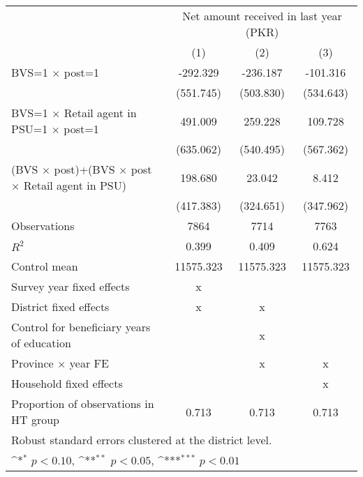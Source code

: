 {
\def\sym#1{\ifmmode^{#1}\else\(^{#1}\)\fi}
\begin{tabular}{l*{3}{c}}
\toprule
                    &\multicolumn{3}{c}{Net amount received in last year (PKR)}       \\\cmidrule(lr){2-4}
                    &\multicolumn{1}{c}{(1)}         &\multicolumn{1}{c}{(2)}         &\multicolumn{1}{c}{(3)}         \\
\midrule
BVS=1 $\times$ post=1&    -292.329         &    -236.187         &    -101.316         \\
                    &   (551.745)         &   (503.830)         &   (534.643)         \\
\addlinespace
BVS=1 $\times$ Retail agent in PSU=1 $\times$ post=1&     491.009         &     259.228         &     109.728         \\
                    &   (635.062)         &   (540.495)         &   (567.362)         \\
\addlinespace
\hline (BVS $\times$ post)+(BVS $\times$  post $\times$ Retail agent in PSU)&     198.680         &      23.042         &       8.412         \\
                    &   (417.383)         &   (324.651)         &   (347.962)         \\
\midrule
Observations        &        7864         &        7714         &        7763         \\
\(R^{2}\)           &       0.399         &       0.409         &       0.624         \\
Control mean        &   11575.323         &   11575.323         &   11575.323         \\
Survey year fixed effects&           x         &                     &                     \\
District fixed effects&           x         &           x         &                     \\
Control for beneficiary years of education&                     &           x         &                     \\
Province $\times$  year FE&                     &           x         &           x         \\
Household fixed effects&                     &                     &           x         \\
Proportion of observations in HT group&       0.713         &       0.713         &       0.713         \\
\bottomrule
\multicolumn{4}{l}{\footnotesize Robust standard errors clustered at the district level.}\\
\multicolumn{4}{l}{\footnotesize \sym{*} \(p<0.10\), \sym{**} \(p<0.05\), \sym{***} \(p<0.01\)}\\
\end{tabular}
}
